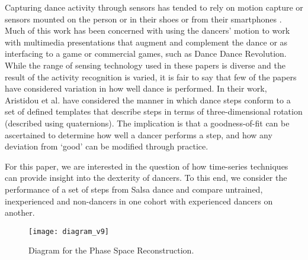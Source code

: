 \documentclass{sigchi}
\begin{document}
Capturing dance activity through sensors has tended to rely on motion capture \cite{Alexiadis2014} %
or sensors mounted on the person \cite{Lynch2005} %
or in their shoes \cite{Paradiso1997} %
or from their smartphones  \cite{Wei2014}. %
Much of this work has been concerned with using the dancers’ motion to work with 
multimedia presentations that augment and complement the dance \cite{Griffith1998, Park2006}
or as interfacing to a game \cite{Chu2012} %
or commercial games, such as Dance Dance Revolution.  
While the range of sensing technology used in these papers is diverse and the result of the activity 
recognition is varied, it is fair to say that few of the papers have considered variation in how well dance 
is performed.  In their work, Aristidou et al. \cite{Aristidou2014} %
have considered the manner in which dance steps conform to a set of defined 
templates that describe steps in terms of three-dimensional rotation (described using quaternions).  
The implication is that a goodness-of-fit can be ascertained to determine how well a dancer performs a step, 
and how any deviation from ‘good’ can be modified through practice. 

For this paper, we are interested in the question of how time-series techniques can provide insight 
into the dexterity of dancers. To this end, we consider the performance of a set of steps from 
Salsa dance and compare untrained, inexperienced and non-dancers in one cohort with experienced dancers on another.





\begin{figure*}[t]
\centering    
\texttt{[image: diagram\_v9]}
\caption[PA]{Diagram for the Phase Space Reconstruction.}
\label{fig:raw_takens_pca}
\end{figure*}
\end{document}
